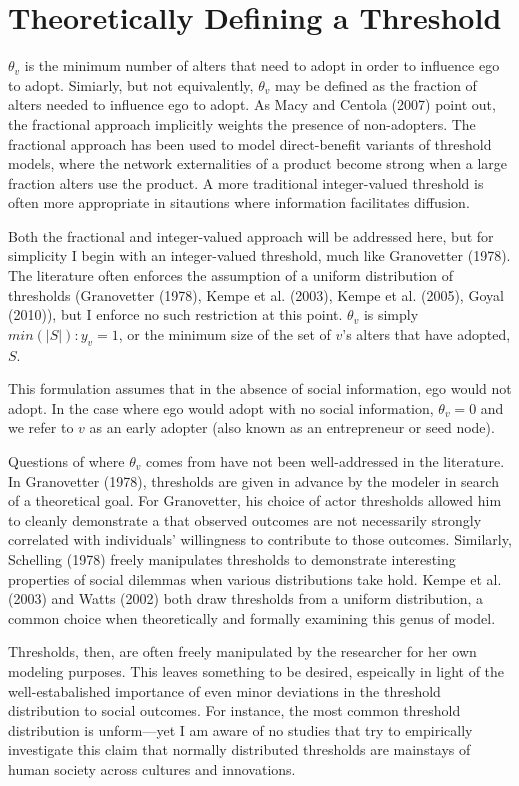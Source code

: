 \documentclass{article}
\begin{document}
\section{Theoretically Defining a Threshold}

$\theta_v$ is the minimum number of alters that need to adopt in order to influence ego to adopt. Simiarly, but not equivalently, $\theta_v$ may be defined as the fraction of alters needed to influence ego to adopt. As Macy and Centola (2007) point out, the fractional approach implicitly weights the presence of non-adopters. The fractional approach has been used to model direct-benefit variants of threshold models, where the network externalities of a product become strong when a large fraction alters use the product. A more traditional integer-valued threshold is often more appropriate in sitautions where information facilitates diffusion. 

Both the fractional and integer-valued approach will be addressed here, but for simplicity I begin with an integer-valued threshold, much like Granovetter (1978). The literature often enforces the assumption of a uniform distribution of thresholds (Granovetter (1978), Kempe et al. (2003), Kempe et al. (2005), Goyal (2010)), but I enforce no such restriction at this point. $\theta_v$ is simply $min(|S|): y_v = 1$, or the minimum size of the set of $v$'s alters that have adopted, $S$.

This formulation assumes that in the absence of social information, ego would not adopt. In the case where ego would adopt with no social information, $\theta_v = 0$ and we refer to $v$ as an early adopter (also known as an entrepreneur or seed node).

Questions of where $\theta_v$ comes from have not been well-addressed in the literature. In Granovetter (1978), thresholds are given in advance by the modeler in search of a theoretical goal. For Granovetter, his choice of actor thresholds allowed him to cleanly demonstrate a that observed outcomes are not necessarily strongly correlated with individuals' willingness to contribute to those outcomes. Similarly, Schelling (1978) freely manipulates thresholds to demonstrate interesting properties of social dilemmas when various distributions take hold. Kempe et al. (2003) and Watts (2002) both draw thresholds from a uniform distribution, a common choice when theoretically and formally examining this genus of model.

Thresholds, then, are often freely manipulated by the researcher for her own modeling purposes. This leaves something to be desired, espeically in light of the well-estabalished importance of even minor deviations in the threshold distribution to social outcomes. For instance, the most common threshold distribution is unform---yet I am aware of no studies that try to empirically investigate this claim that normally distributed thresholds are mainstays of human society across cultures and innovations.
\end{document}
